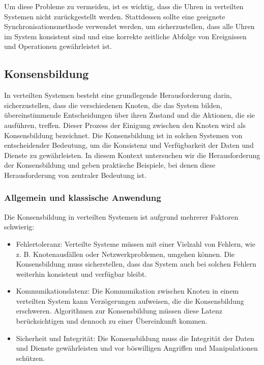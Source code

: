 \documentclass[../vs-script-first-v01.tex]{subfiles}
\begin{document}
Um diese Probleme zu vermeiden, ist es wichtig, dass die Uhren in verteilten Systemen nicht zurückgestellt werden. Stattdessen sollte eine geeignete Synchronisationsmethode verwendet werden, um sicherzustellen, dass alle Uhren im System konsistent sind und eine korrekte zeitliche Abfolge von Ereignissen und Operationen gewährleistet ist.

\label{Woche09}
\subsection{Konsensbildung}

In verteilten Systemen besteht eine grundlegende Herausforderung darin, sicherzustellen, dass die verschiedenen Knoten, die das System bilden, übereinstimmende Entscheidungen über ihren Zustand und die Aktionen, die sie ausführen, treffen. Dieser Prozess der Einigung zwischen den Knoten wird als Konsensbildung bezeichnet. Die Konsensbildung ist in solchen Systemen von entscheidender Bedeutung, um die Konsistenz und Verfügbarkeit der Daten und Dienste zu gewährleisten. In diesem Kontext untersuchen wir die Herausforderung der Konsensbildung und geben praktische Beispiele, bei denen diese Herausforderung von zentraler Bedeutung ist.
\subsubsection{Allgemein und klassische Anwendung}
Die Konsensbildung in verteilten Systemen ist aufgrund mehrerer Faktoren schwierig:
\begin{itemize}
\item  Fehlertoleranz: Verteilte Systeme müssen mit einer Vielzahl von Fehlern, wie z. B. Knotenausfällen oder Netzwerkproblemen, umgehen können. Die Konsensbildung muss sicherstellen, dass das System auch bei solchen Fehlern weiterhin konsistent und verfügbar bleibt.

\item Kommunikationslatenz: Die Kommunikation zwischen Knoten in einem verteilten System kann Verzögerungen aufweisen, die die Konsensbildung erschweren. Algorithmen zur Konsensbildung müssen diese Latenz berücksichtigen und dennoch zu einer Übereinkunft kommen.

\item  Sicherheit und Integrität: Die Konsensbildung muss die Integrität der Daten und Dienste gewährleisten und vor böswilligen Angriffen und Manipulationen schützen.
\end{itemize}
\end{document}
